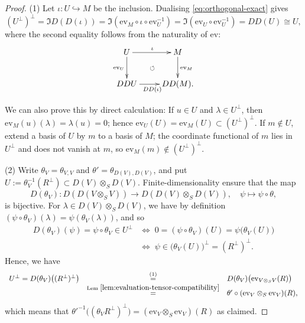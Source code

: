 \begin{proof}
(1) Let $\iota:U\hookrightarrow M$ be the inclusion.
Dualising \eqref{eq:orthogonal-exact} gives
\[
(U^\perp)^\perp=\Im D(D(\iota))=\Im(\mathrm{ev}_M\circ \iota\circ \mathrm{ev}_U^{-1})=\Im(\mathrm{ev}_U\circ \mathrm{ev}_U^{-1})=DD(U)\cong U,
\]
where the second equality follows from the naturality of $\mathrm{ev}$:
\[
\xymatrix{U \ar[r]^\iota \ar[d]_{\mathrm{ev}_U} \ar@{}[rd]|{\circlearrowleft}& M \ar[d]^{\mathrm{ev}_M} \\
DDU \ar[r]_{DD(\iota)}& DD(M). } \]
\begin{supplementary}
We can also prove this by direct calculation:
If $u\in U$ and $\lambda\in U^\perp$, then $\mathrm{ev}_M(u)(\lambda)=\lambda(u)=0$; hence $\mathrm{ev}_U(U)=\mathrm{ev}_M(U)\subset(U^\perp)^\perp$.
If $m\notin U$, extend a basis of $U$ by $m$ to a basis of $M$; the coordinate functional of $m$ lies in $U^\perp$ and does not vanish at $m$, so $\mathrm{ev}_M(m)\notin(U^\perp)^\perp$.
\end{supplementary}

(2) Write $\theta_V=\theta_{V,V}$ and $\theta'=\theta_{D(V),D(V)}$, and put $U:=\theta_V^{-1}(R^\perp)\subset D(V)\otimes_SD(V)$.
Finite-dimensionality ensure that the map
\[ D(\theta_V):D(D(V\otimes_SV))\to D(D(V)\otimes_SD(V)),\quad  \psi\mapsto\psi\circ\theta,\]
is bijective.  For $\lambda \in D(V)\otimes_S D(V)$, we have by definition $(\psi\circ \theta_V)(\lambda)= \psi(\theta_V(\lambda))$, and so
\begin{align*}
D(\theta_V)(\psi)=\psi\circ\theta_V \in U^\perp &\Leftrightarrow\; 
0=(\psi\circ\theta_V)(U)=\psi\big(\theta_V(U)\big) \\ &\Leftrightarrow \; \psi \in \big(\theta_V(U)\big)^\perp=(R^\perp)^\perp.
\end{align*}
Hence, we have 
\[
\begin{array}{rcl}
U^\perp=D(\theta_V)\big((R^\perp)^\perp\big) & \stackrel{(1)}{=} & D(\theta_V)\big(\mathrm{ev}_{V\otimes_SV}(R)\big) \\
& \stackrel{\text{Lem }\ref{lem:evaluation-tensor-compatibility}}{=} & \theta'\circ (\mathrm{ev}_V\otimes_S\mathrm{ev}_V)(R),
\end{array}
\] which means that $\theta'^{-1}\big((\theta_VR^\perp)^\perp\big)=(\mathrm{ev}_V\otimes_S\mathrm{ev}_V)(R)$ as claimed.
\end{proof}

